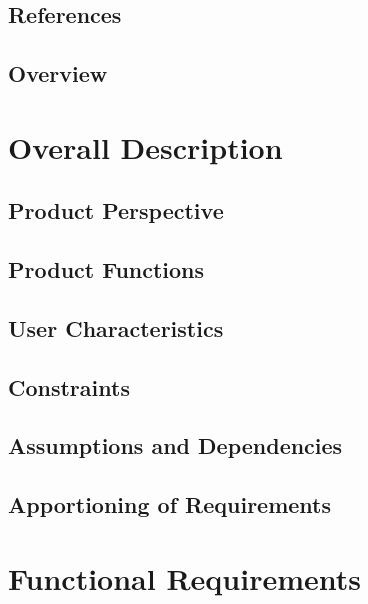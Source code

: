 \documentclass[12pt, titlepage]{article}
\begin{document}
  \subsection{References}
  \subsection{Overview}

\section{Overall Description}

  \subsection{Product Perspective}
  \subsection{Product Functions}
  \subsection{User Characteristics}
  \subsection{Constraints}
  \subsection{Assumptions and Dependencies}
  \subsection{Apportioning of Requirements}

\section{Functional Requirements}
\end{document}

